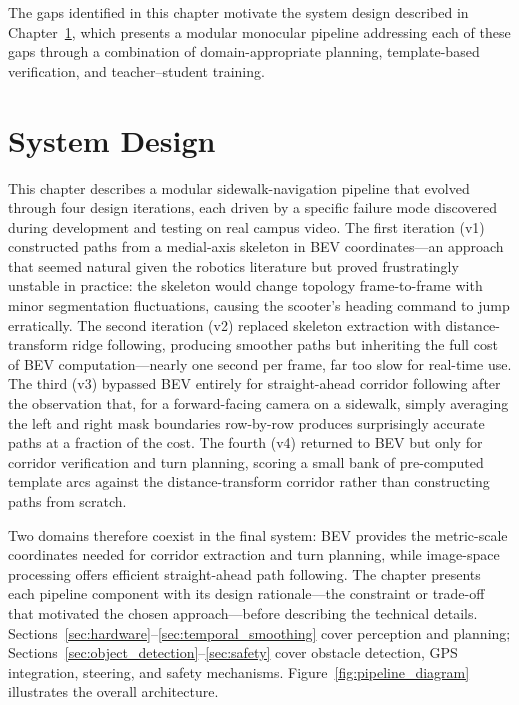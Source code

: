 \documentclass[12pt,letterpaper,oneside]{report}
\begin{document}
The gaps identified in this chapter motivate the system design described in Chapter~\ref{ch:system_design}, which presents a modular monocular pipeline addressing each of these gaps through a combination of domain-appropriate planning, template-based verification, and teacher--student training.


\chapter{System Design}
\label{ch:system_design}

This chapter describes a modular sidewalk-navigation pipeline that evolved through four design iterations, each driven by a specific failure mode discovered during development and testing on real campus video. The first iteration (v1) constructed paths from a medial-axis skeleton in BEV coordinates---an approach that seemed natural given the robotics literature but proved frustratingly unstable in practice: the skeleton would change topology frame-to-frame with minor segmentation fluctuations, causing the scooter's heading command to jump erratically. The second iteration (v2) replaced skeleton extraction with distance-transform ridge following, producing smoother paths but inheriting the full cost of BEV computation---nearly one second per frame, far too slow for real-time use. The third (v3) bypassed BEV entirely for straight-ahead corridor following after the observation that, for a forward-facing camera on a sidewalk, simply averaging the left and right mask boundaries row-by-row produces surprisingly accurate paths at a fraction of the cost. The fourth (v4) returned to BEV but only for corridor verification and turn planning, scoring a small bank of pre-computed template arcs against the distance-transform corridor rather than constructing paths from scratch.

Two domains therefore coexist in the final system: BEV provides the metric-scale coordinates needed for corridor extraction and turn planning, while image-space processing offers efficient straight-ahead path following. The chapter presents each pipeline component with its design rationale---the constraint or trade-off that motivated the chosen approach---before describing the technical details. Sections~\ref{sec:hardware}--\ref{sec:temporal_smoothing} cover perception and planning; Sections~\ref{sec:object_detection}--\ref{sec:safety} cover obstacle detection, GPS integration, steering, and safety mechanisms. Figure~\ref{fig:pipeline_diagram} illustrates the overall architecture.
\end{document}
